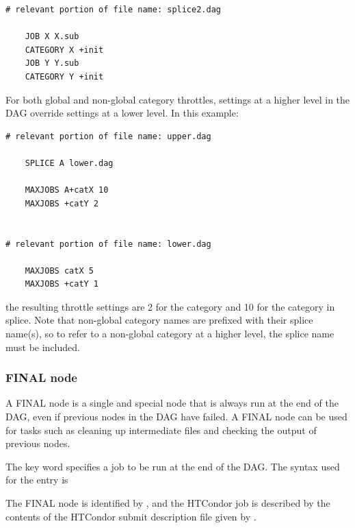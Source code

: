\begin{verbatim}
# relevant portion of file name: splice2.dag

    JOB X X.sub
    CATEGORY X +init
    JOB Y Y.sub
    CATEGORY Y +init

\end{verbatim}

For both global and non-global category throttles, settings at a higher
level in the DAG override settings at a lower level.
In this example:

\begin{verbatim}
# relevant portion of file name: upper.dag

    SPLICE A lower.dag

    MAXJOBS A+catX 10
    MAXJOBS +catY 2


# relevant portion of file name: lower.dag

    MAXJOBS catX 5
    MAXJOBS +catY 1

\end{verbatim}

the resulting throttle settings are 2 for the  category
and 10 for the  category in splice.
Note that non-global category names are
prefixed with their splice name(s), so to refer to a non-global category 
at a higher level, the splice name must be included.


\subsubsection{\label{sec:DAGFinalNode}FINAL node}

A FINAL node is a single and special node that is always run at 
the end of the DAG,
even if previous nodes in the DAG have failed.  
A FINAL node can be used
for tasks such as cleaning up intermediate files and checking the output
of previous nodes.

The  key word specifies a job to be run at the end of
the DAG.  The syntax used for the  entry is

  
 

The FINAL node is identified by , and the HTCondor job
is described by the contents of the HTCondor submit description file
given by .

